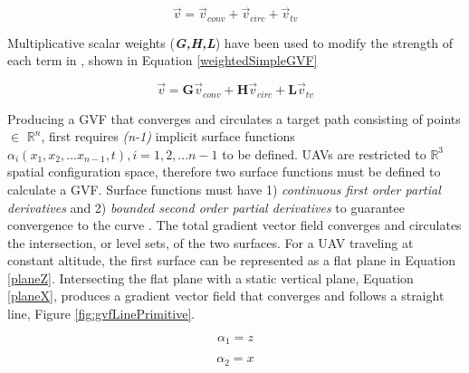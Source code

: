 \documentclass[numbered,pdftex]{ohio-etd}
\begin{document}
\begin{equation}\label{simpleGVF}
\vec{v} = \vec{v}_{conv} + \vec{v}_{circ} + \vec{v}_{tv} 
\end{equation}

Multiplicative scalar weights (\textit{\textbf{G,H,L}}) have been used to modify the strength of each term in \cite{goncalves_circulation_2010}, shown in Equation \ref{weightedSimpleGVF}

\begin{equation}\label{weightedSimpleGVF}
\vec{v} = \boldsymbol{G}\vec{v}_{conv} + \boldsymbol{H}\vec{v}_{circ} + \boldsymbol{L}\vec{v}_{tv} 
\end{equation}


Producing a GVF that converges and circulates a target path consisting of points $\in$ $\mathbb{R}^n$, first requires \textit{(n-1)} implicit surface functions {$\alpha_i(x_1,x_2,...x_{n-1},t), i=1,2,...n-1$} to be defined. UAVs are restricted to $\mathbb{R}^3$ spatial configuration space, therefore two surface functions must be defined to calculate a GVF. Surface functions must have 1) \textit{continuous first order partial derivatives} and 2)\textit{ bounded second order partial derivatives} to guarantee convergence to the curve \cite{goncalves_circulation_2010}. The total gradient vector field converges and circulates the intersection, or level sets, of the two surfaces. For a UAV traveling at constant altitude, the first surface can be represented as a flat plane in Equation \ref{planeZ}. Intersecting the flat plane with a static vertical plane, Equation \ref{planeX}, produces a gradient vector field that converges and follows a straight line, Figure \ref{fig:gvfLinePrimitive}.

\begin{equation}
\label{planeZ}
\alpha_1 = z
\end{equation}

\begin{equation}
\label{planeX}
\alpha_2 = x
\end{equation}
\end{document}
